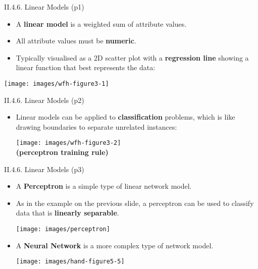 \documentclass[handout]{beamer}
\newcommand{\strong}[1]{\textbf{\color{teal} #1}}
\begin{document}
\begin{frame}{II.4.6. Linear Models (p1)}
\begin{itemize}
\item A \strong{linear model} is a weighted sum of attribute values.
\item All attribute values must be \strong{numeric}.
\item Typically visualised as a 2D scatter plot with a \strong{regression line} showing a linear function that best represents the data:
\end{itemize}
\begin{center}
\texttt{[image: images/wfh-figure3-1]}\\
\cite[Fig 3.1]{WFH3:2011}
\end{center}
\end{frame}
\begin{frame}{II.4.6. Linear Models (p2)}
\begin{itemize}
\item Linear models can be applied to \strong{classification} problems, which is like drawing boundaries to separate unrelated instances:
\begin{center}
\texttt{[image: images/wfh-figure3-2]}\\
\cite[Fig 3.2]{WFH3:2011} \strong{(perceptron training rule)}
\end{center}
\end{itemize}
\end{frame}
\begin{frame}{II.4.6. Linear Models (p3)}
\begin{itemize}
\item A \strong{Perceptron} is a simple type of linear network model.
\item As in the example on the previous slide, a perceptron can be used to classify data that is \strong{linearly separable}.
\begin{center}
\texttt{[image: images/perceptron]}
\end{center}
\item A \strong{Neural Network} is a more complex type of network model.
\begin{center}
\texttt{[image: images/hand-figure5-5]}
\cite[Fig 5.5]{hand-et-al:2001}
\end{center}
\end{itemize}
\end{frame}
\end{document}
